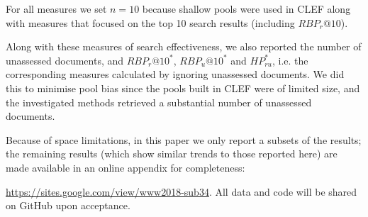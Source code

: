 \noindent For all measures we set $n=10$ because shallow pools were used in CLEF along with measures that focused on the top 10 search results (including $RBP_r@10$).

Along with these measures of search effectiveness, we also reported the number of unassessed documents, and  $RBP_r@10^*$, $RBP_u@10^*$ and $HP_{ru}^*$, i.e. the corresponding measures calculated by ignoring unassessed documents. We did this to minimise pool bias since the pools built in CLEF were of limited size, and the investigated methods retrieved a substantial number of unassessed documents.

Because of space limitations, in this paper we only report a subsets of the results; the remaining results (which show similar trends to those reported here) are made available in an online appendix for completeness: {\url{https://sites.google.com/view/www2018-sub34}. All data and code will be shared on GitHub upon acceptance. 




}
